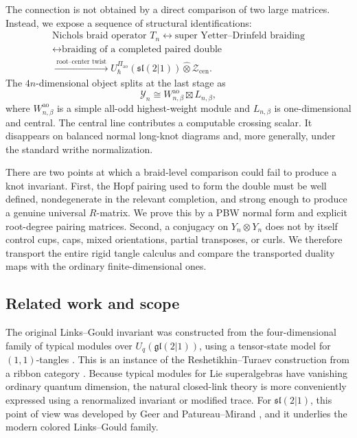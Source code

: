 \documentclass[11pt,a4paper]{article}
\newcommand{\hot}{\widehat\otimes}
\newcommand{\ao}{\mathrm{ao}}
\newcommand{\cen}{\mathrm{cen}}
\theoremstyle{definition}
\theoremstyle{remark}
\begin{document}
The connection is not obtained by a direct comparison of two large
matrices.  Instead, we expose a sequence of structural identifications:
\[
\begin{gathered}
\text{Nichols braid operator }T_n
\longleftrightarrow
\text{super Yetter--Drinfeld braiding}\\
\longleftrightarrow
\text{braiding of a completed paired double}\\
\xrightarrow{\ \text{root--center twist}\ }
U_\hbar^{\Pi_{\ao}}(\mathfrak{sl}(2|1))
\hot \mathcal Z_{\cen}.
\end{gathered}
\]
The \(4n\)-dimensional object splits at the last stage as
\[
 \mathcal Y_n\cong W_{n,\beta}^{\ao}\boxtimes L_{n,\beta},
\]
where \(W_{n,\beta}^{\ao}\) is a simple all-odd highest-weight module and
\(L_{n,\beta}\) is one-dimensional and central.  The central line
contributes a computable crossing scalar.  It disappears on balanced
normal long-knot diagrams and, more generally, under the standard writhe
normalization.

There are two points at which a braid-level comparison could fail to
produce a knot invariant.  First, the Hopf pairing used to form the double
must be well defined, nondegenerate in the relevant completion, and strong
enough to produce a genuine universal \(R\)-matrix.  We prove this by a
PBW normal form and explicit root-degree pairing matrices.  Second, a
conjugacy on \(Y_n\otimes Y_n\) does not by itself control cups, caps,
mixed orientations, partial transposes, or curls.  We therefore transport
the entire rigid tangle calculus and compare the transported duality maps
with the ordinary finite-dimensional ones.

\subsection{Related work and scope}

The original Links--Gould invariant was constructed from the
four-dimensional family of typical modules over
\(U_q(\mathfrak{gl}(2|1))\), using a tensor-state model for
\((1,1)\)-tangles \cite{DeWitKauffmanLinks}.  This is an instance of the
Reshetikhin--Turaev construction from a ribbon category
\cite{ReshetikhinTuraev}.  Because typical modules for Lie superalgebras
have vanishing ordinary quantum dimension, the natural closed-link theory
is more conveniently expressed using a renormalized invariant or modified
trace.  For \(\mathfrak{sl}(2|1)\), this point of view was developed by
Geer and Patureau--Mirand \cite{GeerPatureau}, and it underlies the modern
colored Links--Gould family.
\end{document}
